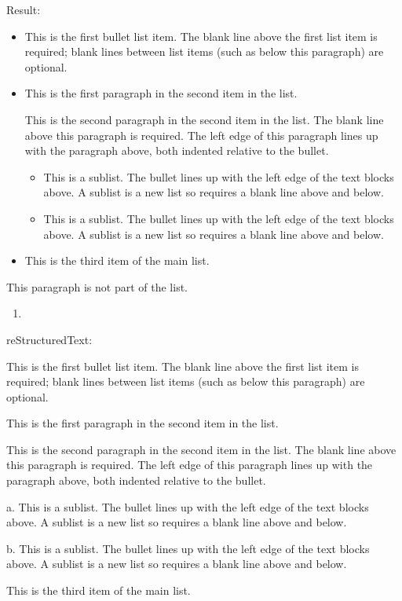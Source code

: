 \documentclass[letterpaper,12pt,english]{sphinxmanual}
\begin{document}
Result:
\begin{itemize}
\item {} 
This is the first bullet list item.  The blank line above the
first list item is required; blank lines between list items
(such as below this paragraph) are optional.

\item {} 
This is the first paragraph in the second item in the list.

This is the second paragraph in the second item in the list.
The blank line above this paragraph is required.  The left edge
of this paragraph lines up with the paragraph above, both
indented relative to the bullet.
\begin{itemize}
\item {} 
This is a sublist.  The bullet lines up with the left edge of
the text blocks above.  A sublist is a new list so requires a
blank line above and below.

\item {} 
This is a sublist.  The bullet lines up with the left edge of
the text blocks above.  A sublist is a new list so requires a
blank line above and below.

\end{itemize}

\item {} 
This is the third item of the main list.

\end{itemize}

This paragraph is not part of the list.
\begin{enumerate}
\def\theenumi{\arabic{enumi}}
\def\labelenumi{\theenumi .}
\makeatletter\def\p@enumii{\p@enumi \theenumi .}\makeatother
\setcounter{enumi}{2}
\item {} 

\end{enumerate}

reStructuredText:

\begin{sphinxVerbatim}[commandchars=\\\{\}]
 This is the first bullet list item.  The blank line above the
   first list item is required; blank lines between list items
   (such as below this paragraph) are optional.

 This is the first paragraph in the second item in the list.

   This is the second paragraph in the second item in the list.
   The blank line above this paragraph is required.  The left edge
   of this paragraph lines up with the paragraph above, both
   indented relative to the bullet.

   a. This is a sublist.  The bullet lines up with the left edge of
      the text blocks above.  A sublist is a new list so requires a
      blank line above and below.

   b. This is a sublist.  The bullet lines up with the left edge of
      the text blocks above.  A sublist is a new list so requires a
      blank line above and below.


 This is the third item of the main list.
\end{sphinxVerbatim}
\end{document}
